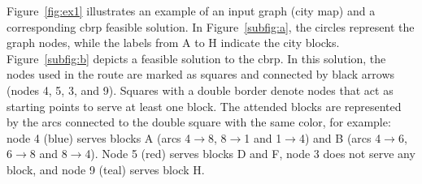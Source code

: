 Figure~\ref{fig:ex1} illustrates an example of an input graph (city map) and
a corresponding \gls{cbrp} feasible solution. In Figure~\ref{subfig:a}, the
circles represent the graph nodes, while the labels from A to H indicate the
city blocks. Figure~\ref{subfig:b} depicts a feasible solution to the
\gls{cbrp}. In this solution, the nodes used in the route are marked as squares
and connected by black arrows (nodes 4, 5, 3, and 9). Squares with a double
border denote nodes that act as starting points to serve at least one block. The
attended blocks are represented by the arcs connected to the double square with
the same color, for example: node 4 (blue) serves blocks A (arcs
4$\rightarrow$8, 8$\rightarrow$1 and 1$\rightarrow$4) and B (arcs
4$\rightarrow$6, 6$\rightarrow$8 and 8$\rightarrow$4). Node 5 (red) serves
blocks D and F, node 3 does not serve any block, and node 9 (teal) serves block
H.

